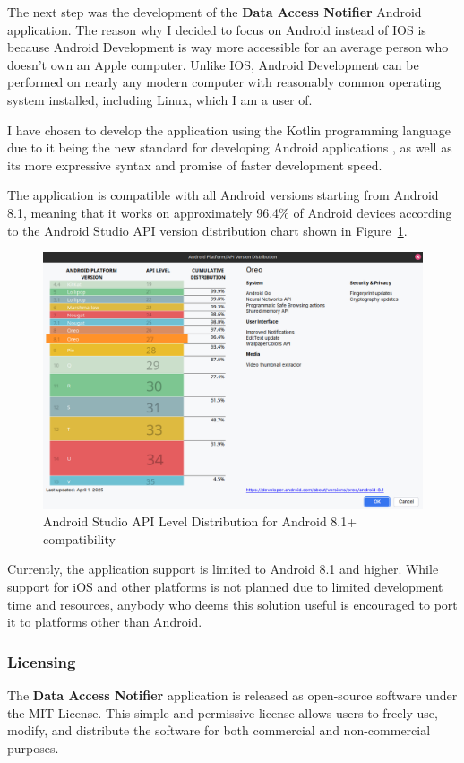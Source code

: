 The next step was the development of the \textbf{Data Access Notifier} Android application. The reason why I decided to focus on Android instead of IOS is because Android Development is way more accessible for an average person who doesn't own an Apple computer. Unlike IOS, Android Development can be performed on nearly any modern computer with reasonably common operating system installed, including Linux, which I am a user of.

I have chosen to develop the application using the Kotlin programming language due to it being the new standard for developing Android applications \cite{kotlin-first}, as well as its more expressive syntax and promise of faster development speed.

The application is compatible with all Android versions starting from Android 8.1, meaning that it works on approximately 96.4\% of Android devices according to the Android Studio API version distribution chart shown in Figure~\ref{fig:android-api-distribution}.

\begin{figure}[H]
\centering
\includegraphics[width=450px]{english/figures/Screenshot from 2025-08-11 22-58-16.png}
\caption{Android Studio API Level Distribution for Android 8.1+ compatibility}
\label{fig:android-api-distribution}
\end{figure}

Currently, the application support is limited to Android 8.1 and higher. While support for iOS and other platforms is not planned due to limited development time and resources, anybody who deems this solution useful is encouraged to port it to platforms other than Android.

\subsubsection{Licensing}
The \textbf{Data Access Notifier} application is released as open-source software under the MIT License. This simple and permissive license allows users to freely use, modify, and distribute the software for both commercial and non-commercial purposes. 

